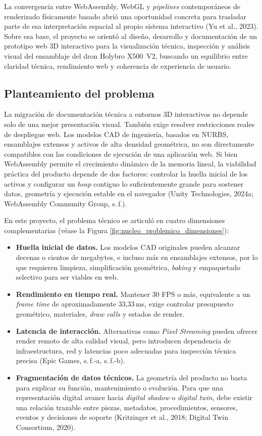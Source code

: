 La convergencia entre WebAssembly, WebGL y \textit{pipelines} contemporáneos de renderizado físicamente basado abrió una oportunidad concreta para trasladar parte de esa interpretación espacial al propio sistema interactivo (Yu et al., 2023). Sobre esa base, el proyecto se orientó al diseño, desarrollo y documentación de un prototipo web 3D interactivo para la visualización técnica, inspección y análisis visual del ensamblaje del dron Holybro X500~V2, buscando un equilibrio entre claridad técnica, rendimiento web y coherencia de experiencia de usuario.

\subsection{Planteamiento del problema}

La migración de documentación técnica a entornos 3D interactivos no depende solo de una mejor presentación visual. También exige resolver restricciones reales de despliegue web. Los modelos CAD de ingeniería, basados en NURBS, ensamblajes extensos y activos de alta densidad geométrica, no son directamente compatibles con las condiciones de ejecución de una aplicación web. Si bien WebAssembly permite el crecimiento dinámico de la memoria lineal, la viabilidad práctica del producto depende de dos factores: controlar la huella inicial de los activos y configurar un \textit{heap} contiguo lo suficientemente grande para sostener datos, geometría y ejecución estable en el navegador (Unity Technologies, 2024a; WebAssembly Community Group, s.\,f.).

En este proyecto, el problema técnico se articuló en cuatro dimensiones complementarias (véase la Figura \ref{fig:nucleo_problemico_dimensiones}):

\begin{itemize}
    \item \textbf{Huella inicial de datos.} Los modelos CAD originales pueden alcanzar decenas o cientos de megabytes, e incluso más en ensamblajes extensos, por lo que requieren limpieza, simplificación geométrica, \textit{baking} y empaquetado selectivo para ser viables en web.
    \item \textbf{Rendimiento en tiempo real.} Mantener 30 FPS o más, equivalente a un \textit{frame time} de aproximadamente 33,33\,ms, exige controlar presupuesto geométrico, materiales, \textit{draw calls} y estados de render.
    \item \textbf{Latencia de interacción.} Alternativas como \textit{Pixel Streaming} pueden ofrecer render remoto de alta calidad visual, pero introducen dependencia de infraestructura, red y latencias poco adecuadas para inspección técnica precisa (Epic Games, s.\,f.-a, s.\,f.-b).
    \item \textbf{Fragmentación de datos técnicos.} La geometría del producto no basta para explicar su función, mantenimiento o evolución. Para que una representación digital avance hacia \textit{digital shadow} o \textit{digital twin}, debe existir una relación trazable entre piezas, metadatos, procedimientos, sensores, eventos y decisiones de soporte (Kritzinger et al., 2018; Digital Twin Consortium, 2020).
\end{itemize}

